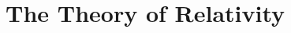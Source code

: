 \documentclass[11pt, onesided]{book}
\theoremstyle{break}
\theoremstyle{break}
\newcommand{\pd}{\partial}
\begin{document}
\newpage
\chapter{The Theory of Relativity}
\setcounter{section}{3}
%
%
\end{document}
